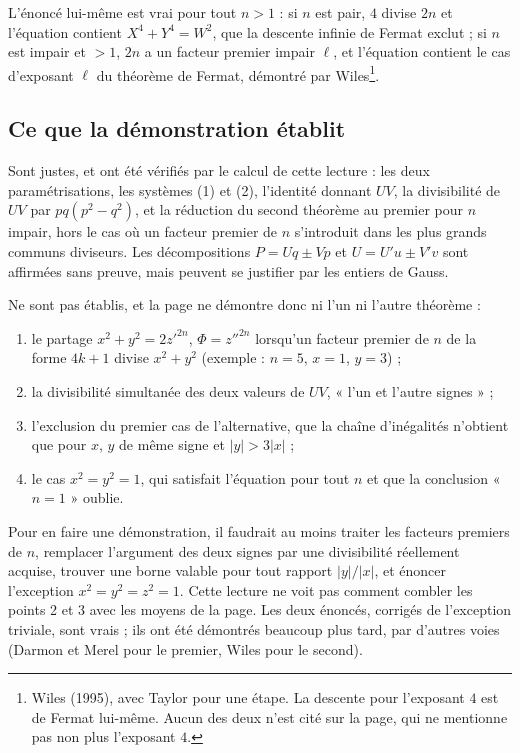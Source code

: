 \documentclass[11pt,a4paper]{article}
\begin{document}
L'énoncé lui-même est vrai pour tout $n>1$ : si $n$ est pair, $4$ divise $2n$ et l'équation contient $X^4+Y^4=W^2$, que la descente infinie de Fermat exclut ; si $n$ est impair et $>1$, $2n$ a un facteur premier impair $\ell$, et l'équation contient le cas d'exposant $\ell$ du théorème de Fermat, démontré par Wiles\footnote{Wiles (1995), avec Taylor pour une étape. La descente pour l'exposant $4$ est de Fermat lui-même. Aucun des deux n'est cité sur la page, qui ne mentionne pas non plus l'exposant $4$.}.

\subsection*{Ce que la démonstration établit}

Sont justes, et ont été vérifiés par le calcul de cette lecture : les deux paramétrisations, les systèmes (1) et (2), l'identité donnant $UV$, la divisibilité de $UV$ par $pq(p^2-q^2)$, et la réduction du second théorème au premier pour $n$ impair, hors le cas où un facteur premier de $n$ s'introduit dans les plus grands communs diviseurs. Les décompositions $P=Uq\pm Vp$ et $U=U'u\pm V'v$ sont affirmées sans preuve, mais peuvent se justifier par les entiers de Gauss.

Ne sont pas établis, et la page ne démontre donc ni l'un ni l'autre théorème :
\begin{enumerate}
\item le partage $x^2+y^2=2z'^{2n}$, $\Phi=z''^{2n}$ lorsqu'un facteur premier de $n$ de la forme $4k+1$ divise $x^2+y^2$ (exemple : $n=5$, $x=1$, $y=3$) ;
\item la divisibilité simultanée des deux valeurs de $UV$, « l'un et l'autre signes » ;
\item l'exclusion du premier cas de l'alternative, que la chaîne d'inégalités n'obtient que pour $x$, $y$ de même signe et $|y|>3|x|$ ;
\item le cas $x^2=y^2=1$, qui satisfait l'équation pour tout $n$ et que la conclusion « $n=1$ » oublie.
\end{enumerate}
Pour en faire une démonstration, il faudrait au moins traiter les facteurs premiers de $n$, remplacer l'argument des deux signes par une divisibilité réellement acquise, trouver une borne valable pour tout rapport $|y|/|x|$, et énoncer l'exception $x^2=y^2=z^2=1$. Cette lecture ne voit pas comment combler les points 2 et 3 avec les moyens de la page. Les deux énoncés, corrigés de l'exception triviale, sont vrais ; ils ont été démontrés beaucoup plus tard, par d'autres voies (Darmon et Merel pour le premier, Wiles pour le second).
\end{document}
